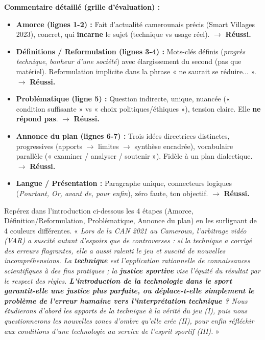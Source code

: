 \documentclass[11pt]{article}
\newcounter{popsec}
\newcounter{popsub}
\newcommand{\courssub}[1]{%
  \stepcounter{popsub}%
  \par\vspace{9pt}\noindent{\popxbold\fontsize{11.5}{13}\selectfont\color{popink}{\color{poporange}\thepopsec.\thepopsub}\hspace{6pt}#1}\par\nopagebreak\vspace{4pt}
}
\begin{document}
\begin{exoresolu}
\textbf{Commentaire détaillé (grille d'évaluation) :}
\begin{itemize}
    \item \textbf{Amorce (lignes 1-2) :} Fait d'actualité camerounais précis (Smart Villages 2023), concret, qui \textbf{incarne} le sujet (technique vs usage réel). $\rightarrow$ \textbf{Réussi.}
    \item \textbf{Définitions / Reformulation (lignes 3-4) :} Mots-clés définis (\textit{progrès technique}, \textit{bonheur d'une société}) avec élargissement du second (pas que matériel). Reformulation implicite dans la phrase « ne saurait se réduire... ». $\rightarrow$ \textbf{Réussi.}
    \item \textbf{Problématique (ligne 5) :} Question indirecte, unique, nuancée (« condition suffisante » vs « choix politiques/éthiques »), tension claire. Elle \textbf{ne répond pas}. $\rightarrow$ \textbf{Réussi.}
    \item \textbf{Annonce du plan (lignes 6-7) :} Trois idées directrices distinctes, progressives (apports $\rightarrow$ limites $\rightarrow$ synthèse encadrée), vocabulaire parallèle (« examiner / analyser / soutenir »). Fidèle à un plan dialectique. $\rightarrow$ \textbf{Réussi.}
    \item \textbf{Langue / Présentation :} Paragraphe unique, connecteurs logiques (\textit{Pourtant, Or, avant de, pour enfin}), zéro faute, ton objectif. $\rightarrow$ \textbf{Réussi.}
\end{itemize}
\end{exoresolu}

\courssub{Exercices d'entraînement progressif}

\begin{exercice}
Repérez dans l'introduction ci-dessous les 4 étapes (Amorce, Définition/Reformulation, Problématique, Annonce du plan) en les surlignant de 4 couleurs différentes.
« \textit{Lors de la CAN 2021 au Cameroun, l'arbitrage vidéo (VAR) a suscité autant d'espoirs que de controverses : si la technique a corrigé des erreurs flagrantes, elle a aussi ralenti le jeu et suscité de nouvelles incompréhensions. La \textbf{technique} est l'application rationnelle de connaissances scientifiques à des fins pratiques ; la \textbf{justice sportive} vise l'équité du résultat par le respect des règles. \textbf{L'introduction de la technologie dans le sport garantit-elle une justice plus parfaite, ou déplace-t-elle simplement le problème de l'erreur humaine vers l'interprétation technique ?} Nous étudierons d'abord les apports de la technique à la vérité du jeu (I), puis nous questionnerons les nouvelles zones d'ombre qu'elle crée (II), pour enfin réfléchir aux conditions d'une technologie au service de l'esprit sportif (III). } »
\end{exercice}
\end{document}
